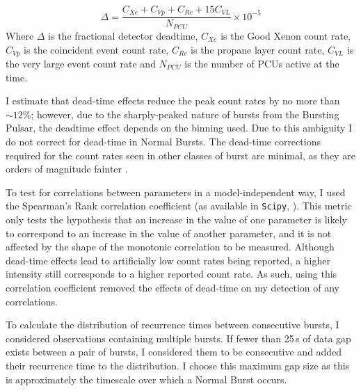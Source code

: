 \begin{equation}
\Delta=\frac{C_{Xe}+C_{Vp}+C_{Rc}+15C_{VL}}{N_{PCU}}\times10^{-5}
\end{equation}
Where $\Delta$ is the fractional detector deadtime, $C_{Xe}$ is the Good Xenon count rate, $C_{Vp}$ is the coincident event count rate, $C_{Rc}$ is the propane layer count rate, $C_{VL}$ is the very large event count rate and $N_{PCU}$ is the number of PCUs active at the time.
\par I estimate that dead-time effects reduce the peak count rates by no more than $\sim12$\%; however, due to the sharply-peaked nature of bursts from the Bursting Pulsar, the deadtime effect depends on the binning used.  Due to this ambiguity I do not correct for dead-time in Normal Bursts.  The dead-time corrections required for the count rates seen in other classes of burst are minimal, as they are orders of magnitude fainter \citep{Giles_BP}.
\par To test for correlations between parameters in a model-independent way, I used the Spearman's Rank correlation coefficient (as available in \texttt{Scipy}, \citealp{NumPy}).  This metric only tests the hypothesis that an increase in the value of one parameter is likely to correspond to an increase in the value of another parameter, and it is not affected by the shape of the monotonic correlation to be measured.  Although dead-time effects lead to artificially low count rates being reported, a higher intensity still corresponds to a higher reported count rate.   As such, using this correlation coefficient removed the effects of dead-time on my detection of any correlations.
\par To calculate the distribution of recurrence times between consecutive bursts, I considered observations containing multiple bursts.  If fewer than 25\,s of data gap exists between a pair of bursts, I considered them to be consecutive and added their recurrence time to the distribution.  I choose this maximum gap size as this is approximately the timescale over which a Normal Burst occurs.
